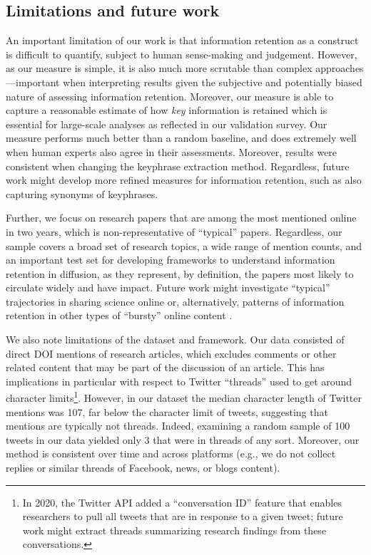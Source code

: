 \documentclass[letterpaper]{article} %
\begin{document}
\subsection{Limitations and future work}
An important limitation of our work is that information retention as a construct is difficult to quantify, subject to human sense-making and judgement. However, as our measure is simple, it is also much more scrutable than complex approaches---important when interpreting results given the subjective and potentially biased nature of assessing information retention. Moreover, our measure is able to capture a reasonable estimate of how \textit{key} information is retained which is essential for large-scale analyses as reflected in our validation survey. Our measure performs much better than a random baseline, and does extremely well when human experts also agree in their assessments. Moreover, results were consistent when changing the keyphrase extraction method. Regardless, future work might develop more refined measures for information retention, such as also capturing synonyms of keyphrases.

Further, we focus on research papers that are among the most mentioned online in two years, which is non-representative of ``typical'' papers. Regardless, our sample covers a broad set of research topics, a wide range of mention counts, and an important test set for developing frameworks to understand information retention in diffusion, as they represent, by definition, the papers most likely to circulate widely and have impact. Future work might investigate ``typical'' trajectories in sharing science online \cite[similar to patterns of structural virality in][]{zakhlebinDiffusionScientificArticles2020} or, alternatively, patterns of information retention in other types of ``bursty'' online content \citep{gilbertWidespreadUnderprovisionReddit2013,chengCanCascadesBe2014,chengCascadesRecur2016}.

We also note limitations of the dataset and framework. Our data consisted of direct DOI mentions of research articles, which excludes comments or other related content that may be part of the discussion of an article. This has implications in particular with respect to Twitter ``threads'' used to get around character limits\footnote{In 2020, the Twitter API added a ``conversation ID'' feature that enables researchers to pull all tweets that are in response to a given tweet; future work might extract threads summarizing research findings from these conversations.}. However, in our dataset the median character length of Twitter mentions was 107, far below the character limit of tweets, suggesting that mentions are typically not threads. Indeed, examining a random sample of 100 tweets in our data yielded only 3 that were in threads of any sort. Moreover, our method is consistent over time and across platforms (e.g., we do not collect replies or similar threads of Facebook, news, or blogs content).
\end{document}
